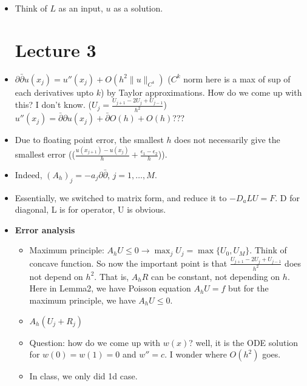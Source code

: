 \documentclass{article}
\newtheorem{theorem}{Theorem}
\theoremstyle{remark}
\newtheorem{example}{Example}
\begin{document}
\begin{itemize}
\begin{example}
If $A$ is symmetric, $\alpha=\lvert \lambda_n\rvert = \sigma_n$. Note that symmetric matrix is orthogonally diagonalizable;$A=V\Sigma V^T$, and eigenvalue can be negative.
\end{example}
Important note for symmetric positive definite matrix (\url{https://math.stackexchange.com/questions/1808799/positive-definite-if-and-only-if-determinants-are-positive}).
\begin{theorem}
Let $a$ be \textbf{positive definite symmetric} bounded bilinear form. Solution for $a(u,v)=L(v)$ exists iff $v=u$ minimizes $F(v)=\frac 12a(v,v)-L(v)$, $v\in H$.
\end{theorem}
\begin{theorem}
(Lax-Milgram)
There is uniqueness.
If $a$ is bounded, $\alpha-$coercive, bilinear form and $L$ is a bounded linear functional on $H$ then solution exists with some boundedness of $u$ by $L$ with coefficient $\alpha$.
\end{theorem}
\item Think of $L$ as an input, $u$ as a solution.

\section*{Lecture 3}
    \item $\partial\bar\partial u(x_j)=u''(x_j)+O(h^2\lVert u\rVert_{C^4})$ ($C^k$ norm here is a max of sup of each derivatives upto $k$) by Taylor approximations. How do we come up with this? I don't know. ($U_j=\frac{U_{j+1}-2U_j+U_{j-1}}{h^2}$)
    $u''(x_j)=\bar\partial\partial u(x_j)+\bar\partial O(h)+O(h)$???
    \item Due to floating point error, the smallest $h$ does not necessarily give the smallest error (($\frac{u(x_{j+1})-u(x_j)}{h}+\frac{\epsilon_1-\epsilon_2}{h}$)).
    
    \item Indeed, $(A_h)_j=-a_j\partial\bar\partial$, $j=1,\dots, M$.
    \item Essentially, we switched to matrix form, and reduce it to $-D_a LU=F$. D for diagonal, L is for operator, U is obvious.
    \item \textbf{Error analysis}
    \begin{itemize}
        \item Maximum principle: $A_hU\leq 0\to \max_j U_j=\max\{U_0,U_M\}$. Think of concave function. So now the important point is that $\frac {U_{j+1}-2U_j+U_{j-1}}{h^2}$ does not depend on $h^2$.  That is, $A_h R$ can be constant, not depending on $h$. Here in Lemma2, we have Poisson equation $A_h U=f$ but for the maximum principle, we have $A_h U\leq 0$.
        \item $A_h(U_j+R_j)$
        \item Question: how do we come up with $w(x)$? well, it is the ODE solution for $w(0)=w(1)=0$ and $w''=c$. I wonder where $O(h^2)$ goes.
        \item In class, we only did 1d case.
    \end{itemize}


\end{itemize}
\end{document}
